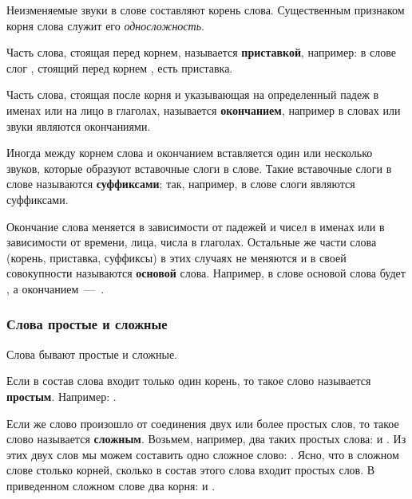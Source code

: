 \documentclass[11pt,a4paper,oneside]{memoir}
\begin{document}
        Неизменяемые звуки в слове составляют корень слова.
        Существенным признаком корня слова служит его \emph{односложность}.

        Часть слова, стоящая перед корнем, называется
        \textbf{приставкой}, например: в слове {}
        слог {}, стоящий перед корнем {}, есть приставка.

        Часть слова, стоящая после корня и указывающая на
        определенный падеж в именах или на лицо в глаголах,
        называется \textbf{окончанием}, например в словах
        {} или {} звуки
        {} являются окончаниями.

        Иногда между корнем слова и окончанием вставляется один или
        несколько звуков, которые образуют вставочные слоги в слове.
        Такие вставочные слоги в слове называются
        \textbf{суффиксами}; так, например, в слове
        {} слоги {} являются суффиксами.

        Окончание слова меняется в зависимости от падежей и чисел в
        именах или в зависимости от времени, лица, числа в глаголах.
        Остальные же части слова (корень, приставка, суффиксы) в этих
        случаях не меняются и в своей совокупности называются
        \textbf{основой} слова. Например, в слове {}
        основой слова будет {}, а окончанием~---~{}.

        \subsubsection{Слова простые и сложные}

        Слова бывают простые и сложные.

        Если в состав слова входит только один корень, то такое слово
        называется \textbf{простым}. Например: {}.

        Если же слово произошло от соединения двух или более простых
        слов, то такое слово называется \textbf{сложным}. Возьмем,
        например, два таких простых слова: {} и
        {}. Из этих двух слов мы можем составить одно
        сложное слово: {}. Ясно, что в сложном
        слове столько корней, сколько в состав этого слова входит
        простых слов. В приведенном сложном слове
        {} два корня: {} и {}.
\end{document}
